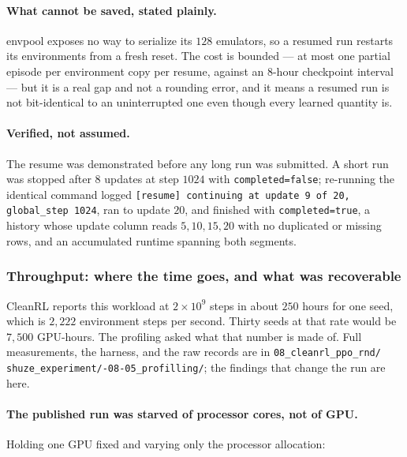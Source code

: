 \paragraph{What cannot be saved, stated plainly.}
envpool exposes no way to serialize its $128$ emulators, so a resumed run restarts its environments
from a fresh reset. The cost is bounded --- at most one partial episode per environment copy per
resume, against an $8$-hour checkpoint interval --- but it is a real gap and not a rounding error,
and it means a resumed run is not bit-identical to an uninterrupted one even though every learned
quantity is.

\paragraph{Verified, not assumed.}
The resume was demonstrated before any long run was submitted. A short run was stopped after $8$
updates at step $1024$ with \texttt{completed=false}; re-running the identical command logged
\texttt{[resume] continuing at update 9 of 20, global\_step 1024}, ran to update $20$, and finished
with \texttt{completed=true}, a history whose update column reads $5, 10, 15, 20$ with no duplicated
or missing rows, and an accumulated runtime spanning both segments.

\subsubsection{Throughput: where the time goes, and what was recoverable}
\label{sec:cleanrl-throughput}

CleanRL reports this workload at $2\times10^{9}$ steps in about $250$ hours for one seed, which is
$2{,}222$ environment steps per second. Thirty seeds at that rate would be $7{,}500$ GPU-hours. The
profiling asked what that number is made of. Full measurements, the harness, and the raw records are
in \texttt{08\_\allowbreak cleanrl\_\allowbreak ppo\_\allowbreak rnd/\allowbreak
shuze\_\allowbreak experiment/-08-05\_\allowbreak profilling/}; the findings that
change the run are here.

\paragraph{The published run was starved of processor cores, not of GPU.}
Holding one GPU fixed and varying only the processor allocation:

